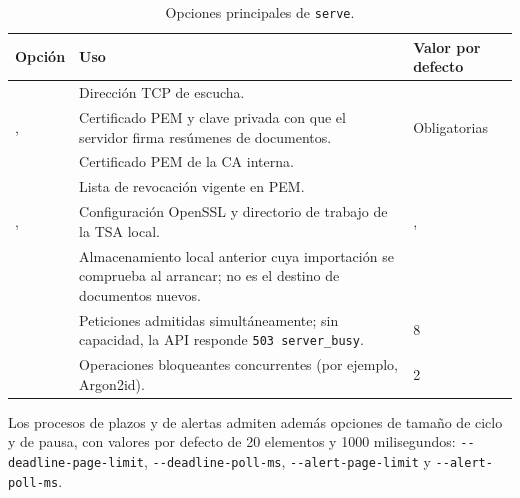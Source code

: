 \begin{table}[htbp]
  \centering\small
  \caption{Opciones principales de \texttt{serve}.}\label{tab:conf-serve}
  \begin{tabularx}{\textwidth}{L{5.0cm} Y L{3.9cm}}
    \toprule
    \textbf{Opción} & \textbf{Uso} & \textbf{Valor por defecto} \\
    \midrule
      & Dirección TCP de escucha.
      &  \\
    , 
      & Certificado PEM y clave privada con que el servidor firma resúmenes
        de documentos.
      & Obligatorias \\
      & Certificado PEM de la CA interna.
      &  \\
      & Lista de revocación vigente en PEM.
      &  \\
    , 
      & Configuración OpenSSL y directorio de trabajo de la TSA local.
      & ,  \\
      & Almacenamiento local anterior cuya importación se comprueba al
        arrancar; no es el destino de documentos nuevos.
      &  \\
      & Peticiones admitidas simultáneamente; sin capacidad, la API responde
        \texttt{503 server\_busy}.
      & 8 \\
      & Operaciones bloqueantes concurrentes (por ejemplo, Argon2id).
      & 2 \\
    \bottomrule
  \end{tabularx}
\end{table}


Los procesos de plazos y de alertas admiten además opciones de tamaño de
ciclo y de pausa, con valores por defecto de 20 elementos y 1000 milisegundos:
\mbox{\texttt{-{}-deadline-page-limit}}, \mbox{\texttt{-{}-deadline-poll-ms}},
\mbox{\texttt{-{}-alert-page-limit}} y \mbox{\texttt{-{}-alert-poll-ms}}.

